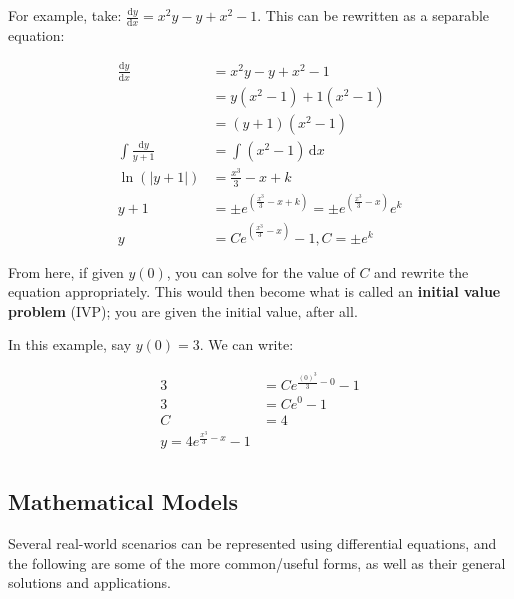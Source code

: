 \documentclass[12pt]{article}
\begin{document}
For example, take: $\frac{\text{d}y}{\text{d}x} = x^2 y - y + x^2 -1$. This can be rewritten as a separable equation:

\begin{equation}
    \begin{split}
        \frac{\text{d}y}{\text{d}x} &= x^2y-y+x^2-1\\
        &= y(x^2-1)+1(x^2-1)\\
        &= (y+1)(x^2-1)\\
        \int \frac{\text{d}y}{y+1} &= \int (x^2-1)\,\text{d}x\\
        \ln(|y+1|) &= \frac{x^3}{3} - x + k\\
        y + 1 &= \pm e^{(\frac{x^3}{3}-x+k)} = \pm e^{(\frac{x^3}{3}-x)}e^k\\
        y &= Ce^{(\frac{x^3}{3}-x)}-1, C = \pm e^k
    \end{split}
\end{equation}

From here, if given $y(0)$, you can solve for the value of $C$ and rewrite the equation appropriately. This would then become what is called an \textbf{initial value problem} (IVP); you are given the initial value, after all. 

In this example, say $y(0) = 3$. We can write:

\begin{equation}
    \begin{split}
        3 &= Ce^{\frac{(0)^3}{3}-0}-1\\
        3 &= Ce^0-1\\
        C &= 4\\
        y = 4e^{\frac{x^3}{3}-x}-1\\
    \end{split}
\end{equation}

\subsection{Mathematical Models}

Several real-world scenarios can be represented using differential equations, and the following are some of the more common/useful forms, as well as their general solutions and applications.
\end{document}

